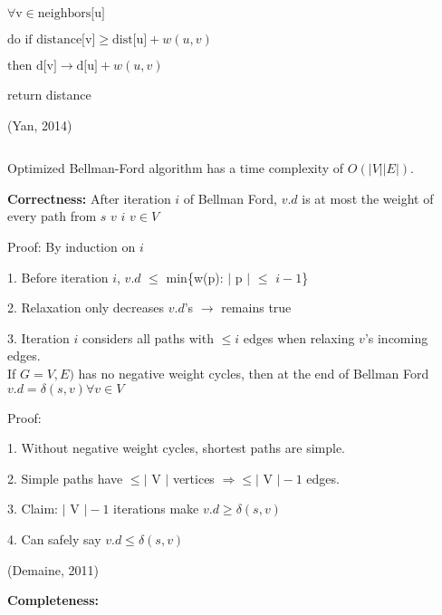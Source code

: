 \documentclass{article}
\begin{document}
\hspace{5 pt}\hspace{5 pt} $\forall \text{v} \in \text{neighbors[u]}$

\hspace{5 pt}\hspace{5 pt}\hspace{5 pt} $\text{do if distance[v]} \geq \text{dist[u]} + w(u,v)$

\hspace{5 pt}\hspace{5 pt}\hspace{5 pt}\hspace{5 pt} $\text{then d[v]} \rightarrow \text{d[u]} + w(u, v)$

return distance

(Yan, 2014)
\begin{verbatim}

\end{verbatim}

Optimized Bellman-Ford algorithm has a time complexity of $O(|V||E|)$.

\textbf{Correctness:}
After iteration $i$ of Bellman Ford, $v.d$ is at most the weight of every path from  $s$  $v$  $i$  $v \in V$

Proof: By induction on $i$

1. Before iteration $i$, $v.d$ $\leq$ min\{w(p):\hspace{1 pt} $\mid$ p $\mid$ $\leq$ $i-1$\} 

2. Relaxation only decreases $v.d$'s $\rightarrow$ remains true

3. Iteration $i$ considers all paths with $\leq i$ edges when relaxing
$v$'s incoming edges.
\\

If $G=V,E)$ has no negative weight cycles, then at the end of Bellman Ford $v.d = \delta(s,v) \forall v \in V$

Proof:

1. Without negative weight cycles, shortest paths are simple.

2. Simple paths have $\leq \mid$ V $\mid$ vertices $\Rightarrow \leq \mid$ V $\mid -  1$ edges.

3. Claim: $\mid$ V $\mid - 1$ iterations make $v.d \geq \delta(s,v)$

4. Can safely say $v.d \leq \delta(s,v)$

(Demaine, 2011)

\textbf{Completeness:}
\end{document}

